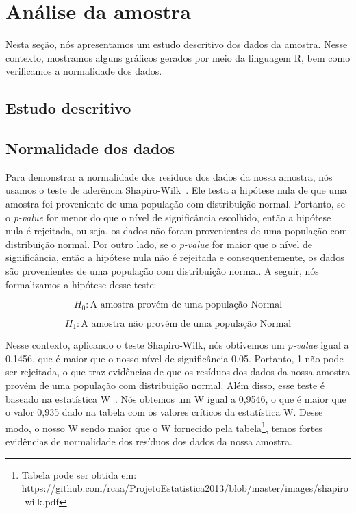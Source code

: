 \section{An\'alise da amostra}
\label{sec:analise}

Nesta seção, nós apresentamos um estudo descritivo dos dados da amostra. Nesse contexto, mostramos alguns gráficos gerados por meio da linguagem R, bem como verificamos a normalidade dos dados.

\subsection{Estudo descritivo}
\label{sec:estudo}





\subsection{Normalidade dos dados}
\label{sec:normalidade}

Para demonstrar a normalidade dos resíduos dos dados da nossa amostra, nós usamos o teste de aderência Shapiro-Wilk~\cite{shapirowilk}. Ele testa a hipótese nula de que uma amostra foi proveniente de uma população com distribuição normal. Portanto, se o \emph{p-value} for menor do que o nível de significância escolhido, então a hipótese nula é rejeitada, ou seja, os dados não foram provenientes de uma população com distribuição normal. Por outro lado, se o \emph{p-value} for maior que o nível de significância, então a hipótese nula não é rejeitada e consequentemente, os dados são provenientes de uma população com distribuição normal. A seguir, nós formalizamos a hipótese desse teste:

\begin{equation}
	H_{0} : \text{A amostra provém de uma população Normal}
\end{equation}

\begin{equation}
	H_{1} : \text{A amostra não provém de uma população Normal}
\end{equation}

Nesse contexto, aplicando o teste Shapiro-Wilk, nós obtivemos um \emph{p-value} igual a 0,1456, que é maior que o nosso nível de significância 0,05. Portanto, 1 não pode ser rejeitada, o que traz evidências de que os resíduos dos dados da nossa amostra provém de uma população com distribuição normal. Além disso, esse teste é baseado na estatística W~\cite{estatisticaw}. Nós obtemos um W igual a 0,9546, o que é maior que o valor 0,935 dado na tabela com os valores críticos da estatística W. Desse modo, o nosso W sendo maior que o W fornecido pela tabela\footnote{Tabela pode ser obtida em: https://github.com/rcaa/ProjetoEstatistica2013/blob/master/images/shapiro-wilk.pdf}, temos fortes evidências de normalidade dos resíduos dos dados da nossa amostra.

